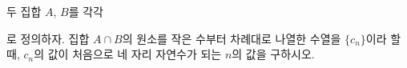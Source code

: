 두 집합 $A$, $B$를 각각\par\smallskip{}\par\smallskip\noindent 로 정의하자. 집합 $A\cap B$의 원소를 작은 수부터 차례대로 나열한 수열을 $\{c_n\}$이라 할 때, $c_n$의 값이 처음으로 네 자리 자연수가 되는 $n$의 값을 구하시오.
